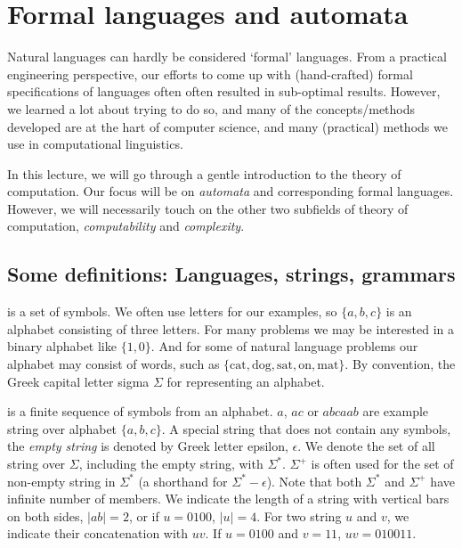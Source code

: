\chapter{\label{ch:formal-languages}Formal languages and automata}

Natural languages can hardly be considered `formal' languages.%
From a practical engineering perspective,
our efforts to come up with (hand-crafted) formal specifications of
languages often often resulted in sub-optimal results.
However, we learned a lot about trying to do so,
and many of the concepts/methods developed are at the hart of computer science,
and many (practical) methods we use in computational linguistics.

In this lecture,
we will go through a gentle introduction to the theory of computation.
Our focus will be on \emph{automata} and corresponding formal languages.
However, we will necessarily touch on the other two subfields of
theory of computation, \emph{computability} and \emph{complexity}.

\section{Some definitions: Languages, strings, grammars}

 is a set of symbols.
We often use letters for our examples,
so $\{a, b, c\}$ is an alphabet consisting of three letters.
For many problems we may be interested in a binary alphabet like $\{1, 0\}$.
And for some of natural language problems our alphabet may consist of words,
such as $\{\text{cat}, \text{dog}, \text{sat}, \text{on}, \text{mat}\}$.
By convention, the Greek capital letter sigma $\Sigma$ for representing 
an alphabet.

 is a finite sequence of symbols from an alphabet.
$a$, $ac$ or $abcaab$
are example string over alphabet $\{a, b, c\}$.
A special string that does not contain any symbols,
the \emph{empty string} is denoted by Greek letter epsilon, $\epsilon$.
We denote the set of all string over $\Sigma$,
including the empty string, with $\Sigma^{*}$.
$\Sigma^{+}$ is often used for the set of non-empty string in $\Sigma^{*}$
(a shorthand for $\Sigma^{*} - {\epsilon}$).
Note that both $\Sigma^{*}$ and $\Sigma^{+}$ have infinite number of members.
We indicate the length of a string with vertical bars on both sides,
$\lvert{}ab\rvert = 2$, or if $u = 0100$, $\lvert{}u\rvert{} = 4$.
For two string $u$ and $v$, we indicate their concatenation with $uv$.
If $u = 0100$ and $v = 11$, $uv = 010011$.

